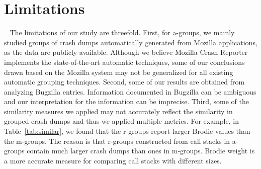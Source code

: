 \section{Limitations}~\label{sec:limitations}
The limitations of our study are threefold. First, for a-groups, we mainly studied groups of crash dumps automatically generated from Mozilla applications, as the data are publicly available. Although we believe Mozilla Crash Reporter implements the state-of-the-art automatic techniques, some of our conclusions drawn based on the Mozilla system may not be generalized for all existing automatic grouping techniques. Second, some of our results are obtained from analyzing Bugzilla entries. Information documented in Bugzilla can be ambiguous and our interpretation for the information can be imprecise. Third, some of the similarity measures we applied may not accurately reflect the similarity in grouped crash dumps and thus we applied multiple metrics. For example, in Table~\ref{tab:similar}, we found that the r-groups report larger Brodie values than the m-groups. The reason is that r-groups constructed from call stacks in a-groups contain much larger crash dumps than ones in m-groups. Brodie weight is a more accurate measure for comparing call stacks with different sizes.

